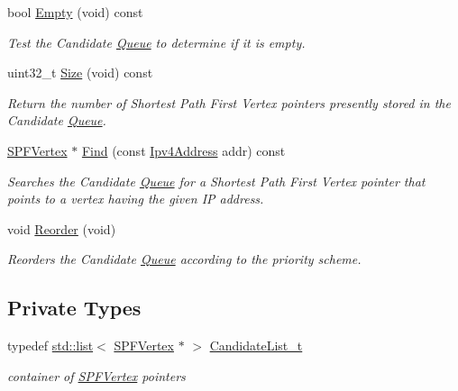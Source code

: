 \begin{DoxyCompactItemize}
bool \hyperlink{classns3_1_1CandidateQueue_adce1ae9bc553e05badc006751b8cf08c}{Empty} (void) const 
\begin{DoxyCompactList}\small\item\em Test the Candidate \hyperlink{classns3_1_1Queue}{Queue} to determine if it is empty. \end{DoxyCompactList}\item 
uint32\+\_\+t \hyperlink{classns3_1_1CandidateQueue_a05b2aa624b28b494ba5a2b5214abd017}{Size} (void) const 
\begin{DoxyCompactList}\small\item\em Return the number of Shortest Path First Vertex pointers presently stored in the Candidate \hyperlink{classns3_1_1Queue}{Queue}. \end{DoxyCompactList}\item 
\hyperlink{classns3_1_1SPFVertex}{S\+P\+F\+Vertex} $\ast$ \hyperlink{classns3_1_1CandidateQueue_aa30bceb9827782adfcec6ee4f94cd9d6}{Find} (const \hyperlink{classns3_1_1Ipv4Address}{Ipv4\+Address} addr) const 
\begin{DoxyCompactList}\small\item\em Searches the Candidate \hyperlink{classns3_1_1Queue}{Queue} for a Shortest Path First Vertex pointer that points to a vertex having the given IP address. \end{DoxyCompactList}\item 
void \hyperlink{classns3_1_1CandidateQueue_af258e0f4eb3ed5f04fb99c2e6e40c6c2}{Reorder} (void)
\begin{DoxyCompactList}\small\item\em Reorders the Candidate \hyperlink{classns3_1_1Queue}{Queue} according to the priority scheme. \end{DoxyCompactList}\end{DoxyCompactItemize}
\subsection*{Private Types}
\begin{DoxyCompactItemize}
\item 
typedef \hyperlink{openflow-interface_8h_afd9bcfa176617760671b67580f536fa7}{std\+::list}$<$ \hyperlink{classns3_1_1SPFVertex}{S\+P\+F\+Vertex} $\ast$ $>$ \hyperlink{classns3_1_1CandidateQueue_a8cd2e310f0b257a519afecbf5aeb6f2e}{Candidate\+List\+\_\+t}
\begin{DoxyCompactList}\small\item\em container of \hyperlink{classns3_1_1SPFVertex}{S\+P\+F\+Vertex} pointers \end{DoxyCompactList}\end{DoxyCompactItemize}
